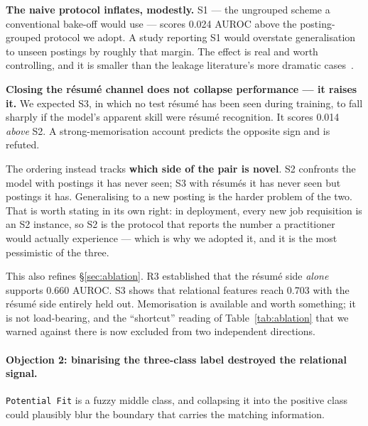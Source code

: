 \documentclass[11pt]{article}                      %
\begin{document}
\textbf{The naive protocol inflates, modestly.} S1 --- the ungrouped scheme a
conventional bake-off would use --- scores 0.024 AUROC above the posting-grouped
protocol we adopt. A study reporting S1 would overstate generalisation to unseen
postings by roughly that margin. The effect is real and worth controlling, and it
is smaller than the leakage literature's more dramatic
cases~\cite{kapoor2023leakage}.

\textbf{Closing the résumé channel does not collapse performance --- it raises
it.} We expected S3, in which no test résumé has been seen during training, to
fall sharply if the model's apparent skill were résumé recognition. It scores
0.014 \emph{above} S2. A strong-memorisation account predicts the opposite sign
and is refuted.

The ordering instead tracks \textbf{which side of the pair is novel}. S2 confronts
the model with postings it has never seen; S3 with résumés it has never seen but
postings it has. Generalising to a new posting is the harder problem of the two.
That is worth stating in its own right: in deployment, every new job requisition
is an S2 instance, so S2 is the protocol that reports the number a practitioner
would actually experience --- which is why we adopted it, and it is the most
pessimistic of the three.

This also refines \S\ref{sec:ablation}. R3 established that the résumé side
\emph{alone} supports 0.660 AUROC. S3 shows that relational features reach 0.703
with the résumé side entirely held out. Memorisation is available and worth
something; it is not load-bearing, and the ``shortcut'' reading of
Table~\ref{tab:ablation} that we warned against there is now excluded from two
independent directions.

\paragraph{Objection 2: binarising the three-class label destroyed the relational
signal.}
\texttt{Potential Fit} is a fuzzy middle class, and collapsing it into the
positive class could plausibly blur the boundary that carries the matching
information.
\end{document}
